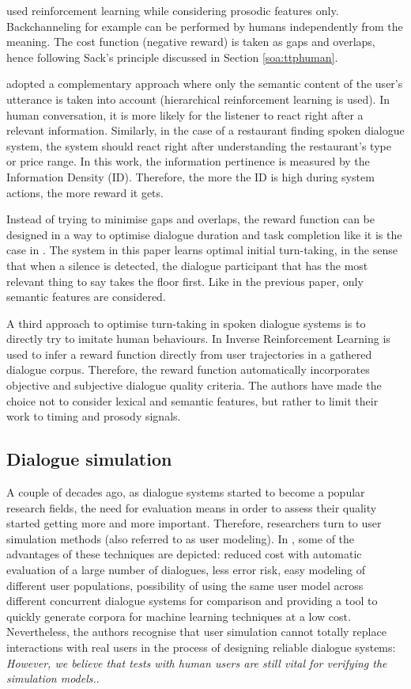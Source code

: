         \cite{Jonsdottir2008} used reinforcement learning while considering prosodic features only. Backchanneling for example can be performed by humans independently from the meaning. The cost function (negative reward) is taken as gaps and overlaps, hence following Sack's principle discussed in Section \ref{soa:ttphuman}.
        
        \cite{Dethlefs2012} adopted a complementary approach where only the semantic content of the user's utterance is taken into account (hierarchical reinforcement learning is used). In human conversation, it is more likely for the listener to react right after a relevant information. Similarly, in the case of a restaurant finding spoken dialogue system, the system should react right after understanding the restaurant's type or price range. In this work, the information pertinence is measured by the Information Density (ID). Therefore, the more the ID is high during system actions, the more reward it gets.
        
        Instead of trying to minimise gaps and overlaps, the reward function can be designed in a way to optimise dialogue duration and task completion like it is the case in \cite{Selfridge2010}. The system in this paper learns optimal initial turn-taking, in the sense that when a silence is detected, the dialogue participant that has the most relevant thing to say takes the floor first. Like in the previous paper, only semantic features are considered.
        
        A third approach to optimise turn-taking in spoken dialogue systems is to directly try to imitate human behaviours. In \cite{Kim2014} Inverse Reinforcement Learning is used to infer a reward function directly from user trajectories in a gathered dialogue corpus. Therefore, the reward function automatically incorporates objective and subjective dialogue quality criteria. The authors have made the choice not to consider lexical and semantic features, but rather to limit their work to timing and prosody signals.
    
    \subsection{Dialogue simulation}
    
    	A couple of decades ago, as dialogue systems started to become a popular research fields, the need for evaluation means in order to assess their quality started getting more and more important. Therefore, researchers turn to user simulation methods (also referred to as user modeling). In \cite{Eckert1997}, some of the advantages of these techniques are depicted: reduced cost with automatic evaluation of a large number of dialogues, less error risk, easy modeling of different user populations, possibility of using the same user model across different concurrent dialogue systems for comparison and providing a tool to quickly generate corpora for machine learning techniques at a low cost. Nevertheless, the authors recognise that user simulation cannot totally replace interactions with real users in the process of designing reliable dialogue systems: \textit{However, we believe that tests with human users are still vital for verifying the simulation models.}.
        
